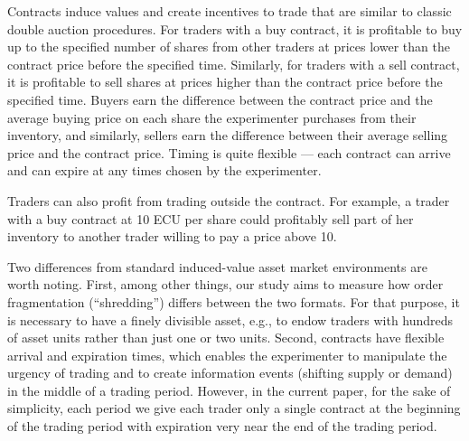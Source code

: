 \documentclass[12pt]{article}
\begin{document}
Contracts induce values and create incentives to trade that are similar to classic double auction procedures.
For traders with a buy contract, it is profitable to buy up to the specified number of shares from other traders at prices lower than the contract price before the specified time. 
Similarly, for traders with a sell contract, it is profitable to sell shares at prices higher than the contract price before the specified time. 
Buyers earn the difference between the contract price and the average buying price on each share the experimenter purchases from their  inventory, and similarly, sellers  earn the difference between their average selling price and the contract price. 
Timing is quite flexible --- each contract can arrive and can expire at any times chosen by the experimenter. 

Traders can also profit from trading outside the contract. For example, a trader with a buy contract at 10 ECU per share could profitably sell part of her inventory to another trader willing to pay a price above 10. 

Two differences from standard induced-value asset market environments are worth noting. First, among other things, our study aims to measure how order fragmentation (``shredding'') differs between the two formats. For that purpose, it is necessary to have a finely divisible asset, e.g., to endow traders with hundreds of asset units rather than just one or two units.  
Second, contracts  have flexible arrival and expiration times, which enables the experimenter to manipulate the urgency of trading and to create information events (shifting supply or demand) in the middle of a trading period. However, in the current paper, for the sake of simplicity, each period we give each trader only a single contract at the beginning of the trading period with expiration very near the end of the trading period. 

\end{document}
